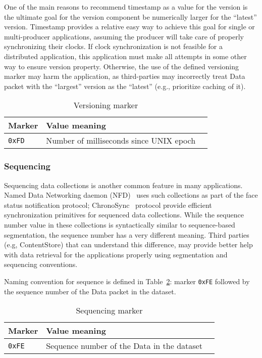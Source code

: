 One of the main reasons to recommend timestamp as a value for the version is the ultimate goal for the version component be numerically larger for the ``latest'' version.
Timestamp provides a relative easy way to achieve this goal for single or multi-producer applications, assuming the producer will take care of properly synchronizing their clocks.
If clock synchronization is not feasible for a distributed application, this application must make all attempts in some other way to ensure version property.
Otherwise, the use of the defined versioning marker may harm the application, as third-parties may incorrectly treat Data packet with the ``largest'' version as the ``latest'' (e.g., prioritize caching of it).

\begin{table}[h!]
  \centering
  \caption{Versioning marker}
  \label{tab:versioning}
  \begin{tabular}{|l|l|l|}
    \hline
    Marker & Value meaning \\
    \hline \hline
    \verb|0xFD| & Number of milliseconds since UNIX epoch \\
    \hline
  \end{tabular}
\end{table}


\subsubsection{Sequencing}
\label{sec:sequencing}

Sequencing data collections is another common feature in many applications.
Named Data Networking daemon (NFD)~\cite{nfd} uses such collections as part of the face status notification protocol; ChronoSync~\cite{ChronoSync} protocol provide efficient synchronization primitives for sequenced data collections.
While the sequence number value in these collections is syntactically similar to sequence-based segmentation, the sequence number has a very different meaning.
Third parties (e.g, ContentStore) that can understand this difference, may provide better help with data retrieval for the applications properly using segmentation and sequencing conventions.

Naming convention for sequence is defined in Table~\ref{tab:sequencing}: marker \verb|0xFE| followed by the sequence number of the Data packet in the dataset.

\begin{table}[h!]
  \centering
  \caption{Sequencing marker}
  \label{tab:sequencing}
  \begin{tabular}{|l|l|l|}
    \hline
    Marker & Value meaning \\
    \hline \hline
    \verb|0xFE| & Sequence number of the Data in the dataset \\
    \hline
  \end{tabular}
\end{table}


